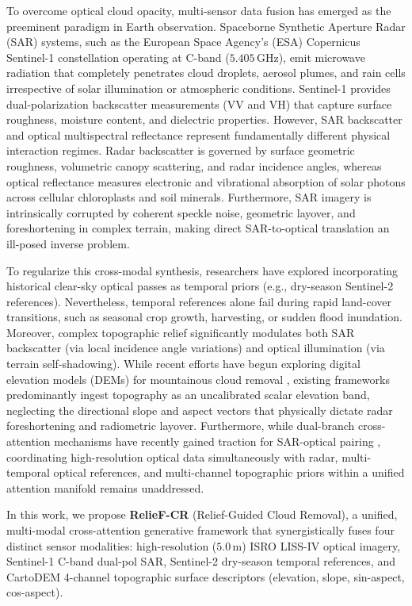To overcome optical cloud opacity, multi-sensor data fusion has emerged as the preeminent paradigm in Earth observation. Spaceborne Synthetic Aperture Radar (SAR) systems, such as the European Space Agency's (ESA) Copernicus Sentinel-1 constellation operating at C-band ($5.405\,\text{GHz}$), emit microwave radiation that completely penetrates cloud droplets, aerosol plumes, and rain cells irrespective of solar illumination or atmospheric conditions. Sentinel-1 provides dual-polarization backscatter measurements (VV and VH) that capture surface roughness, moisture content, and dielectric properties. However, SAR backscatter and optical multispectral reflectance represent fundamentally different physical interaction regimes. Radar backscatter is governed by surface geometric roughness, volumetric canopy scattering, and radar incidence angles, whereas optical reflectance measures electronic and vibrational absorption of solar photons across cellular chloroplasts and soil minerals. Furthermore, SAR imagery is intrinsically corrupted by coherent speckle noise, geometric layover, and foreshortening in complex terrain, making direct SAR-to-optical translation an ill-posed inverse problem.

To regularize this cross-modal synthesis, researchers have explored incorporating historical clear-sky optical passes as temporal priors (e.g., dry-season Sentinel-2 references). Nevertheless, temporal references alone fail during rapid land-cover transitions, such as seasonal crop growth, harvesting, or sudden flood inundation. Moreover, complex topographic relief significantly modulates both SAR backscatter (via local incidence angle variations) and optical illumination (via terrain self-shadowing). While recent efforts have begun exploring digital elevation models (DEMs) for mountainous cloud removal \cite{boumahdi2025multimodal}, existing frameworks predominantly ingest topography as an uncalibrated scalar elevation band, neglecting the directional slope and aspect vectors that physically dictate radar foreshortening and radiometric layover. Furthermore, while dual-branch cross-attention mechanisms have recently gained traction for SAR-optical pairing \cite{hu2025dbcr}, coordinating high-resolution optical data simultaneously with radar, multi-temporal optical references, and multi-channel topographic priors within a unified attention manifold remains unaddressed.

In this work, we propose \textbf{RelieF-CR} (Relief-Guided Cloud Removal), a unified, multi-modal cross-attention generative framework that synergistically fuses four distinct sensor modalities: high-resolution ($5.0\,\text{m}$) ISRO LISS-IV optical imagery, Sentinel-1 C-band dual-pol SAR, Sentinel-2 dry-season temporal references, and CartoDEM 4-channel topographic surface descriptors (elevation, slope, sin-aspect, cos-aspect). 

